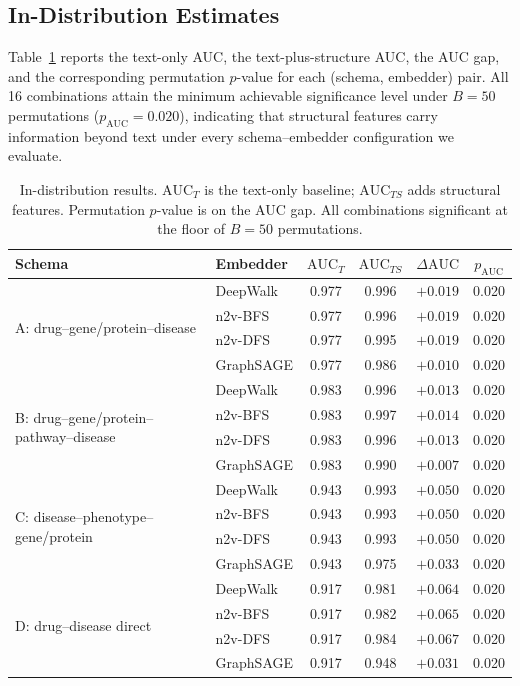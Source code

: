 \documentclass{article}
\theoremstyle{plain}
\theoremstyle{definition}
\theoremstyle{remark}
\begin{document}
\subsection{In-Distribution Estimates}
\label{sec:in-dist}

Table~\ref{tab:in-dist} reports the text-only AUC, the text-plus-structure AUC, the AUC gap, and the corresponding permutation $p$-value for each (schema, embedder) pair. All 16 combinations attain the minimum achievable significance level under $B=50$ permutations ($p_{\mathrm{AUC}} = 0.020$), indicating that structural features carry information beyond text under every schema--embedder configuration we evaluate.

\begin{table}[h!]
\centering
\caption{In-distribution results. $\mathrm{AUC}_T$ is the text-only baseline; $\mathrm{AUC}_{TS}$ adds structural features. Permutation $p$-value is on the AUC gap. All combinations significant at the floor of $B=50$ permutations.}
\label{tab:in-dist}
\small
\begin{tabular}{l l c c c c}
\toprule
Schema & Embedder & $\mathrm{AUC}_T$ & $\mathrm{AUC}_{TS}$ & $\Delta\mathrm{AUC}$ & $p_{\mathrm{AUC}}$ \\
\midrule
\multirow{4}{*}{A: drug--gene/protein--disease}
& DeepWalk     & 0.977 & 0.996 & $+0.019$ & 0.020 \\
& n2v-BFS      & 0.977 & 0.996 & $+0.019$ & 0.020 \\
& n2v-DFS      & 0.977 & 0.995 & $+0.019$ & 0.020 \\
& GraphSAGE    & 0.977 & 0.986 & $+0.010$ & 0.020 \\
\midrule
\multirow{4}{*}{B: drug--gene/protein--pathway--disease}
& DeepWalk     & 0.983 & 0.996 & $+0.013$ & 0.020 \\
& n2v-BFS      & 0.983 & 0.997 & $+0.014$ & 0.020 \\
& n2v-DFS      & 0.983 & 0.996 & $+0.013$ & 0.020 \\
& GraphSAGE    & 0.983 & 0.990 & $+0.007$ & 0.020 \\
\midrule
\multirow{4}{*}{C: disease--phenotype--gene/protein}
& DeepWalk     & 0.943 & 0.993 & $+0.050$ & 0.020 \\
& n2v-BFS      & 0.943 & 0.993 & $+0.050$ & 0.020 \\
& n2v-DFS      & 0.943 & 0.993 & $+0.050$ & 0.020 \\
& GraphSAGE    & 0.943 & 0.975 & $+0.033$ & 0.020 \\
\midrule
\multirow{4}{*}{D: drug--disease direct}
& DeepWalk     & 0.917 & 0.981 & $+0.064$ & 0.020 \\
& n2v-BFS      & 0.917 & 0.982 & $+0.065$ & 0.020 \\
& n2v-DFS      & 0.917 & 0.984 & $+0.067$ & 0.020 \\
& GraphSAGE    & 0.917 & 0.948 & $+0.031$ & 0.020 \\
\bottomrule
\end{tabular}
\end{table}
\end{document}
